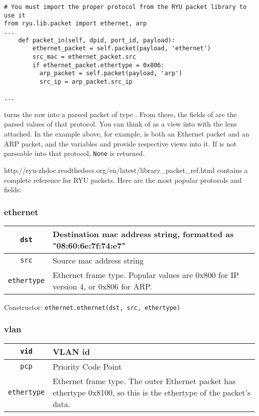 \begin{verbatim}
# You must import the proper protocol from the RYU packet library to use it
from ryu.lib.packet import ethernet, arp
...
    def packet_in(self, dpid, port_id, payload):
        ethernet_packet = self.packet(payload, 'ethernet')
        src_mac = ethernet_packet.src
        if ethernet_packet.ethertype = 0x806:
          arp_packet = self.packet(payload, 'arp')
          src_ip = arp_packet.src_ip

...
\end{verbatim}

 turns the raw 
 into a parsed packet of type .  
From there, the fields of  are the parsed values of that protocol.  
You can think of  as a view into  with the 
 lens attached.  
In the example above, for example,  is both an Ethernet packet and an ARP packet, and the 
variables  and  provide respective views into it.   
If  is not parseable into that protocol, \texttt{None} is returned.  

http://ryu-zhdoc.readthedocs.org/en/latest/library\_packet\_ref.html 
contains a complete reference for RYU packets. 
Here are the most popular protocols and fields:

\subsubsection{ethernet}

\bigskip
\begin{tabularx}{\linewidth}{|c|X|}
\hline\hline
\texttt{dst} & Destination mac address string, formatted as "08:60:6e:7f:74:e7" 
\\ \hline
\texttt{src} & Source mac address string 
\\ \hline
\texttt{ethertype} & Ethernet frame type.  
Popular values are 0x800 for IP version 4, or 0x806 for ARP.  
\\ \hline\hline
\end{tabularx}

\bigskip
Constructor: \texttt{ethernet.ethernet(dst, src, ethertype)}

\subsubsection{vlan}

\bigskip
\begin{tabularx}{\linewidth}{|c|X|}
\hline\hline
\texttt{vid} & VLAN id 
\\ \hline
\texttt{pcp} & Priority Code Point 
\\ \hline
\texttt{ethertype} & Ethernet frame type.  
The outer Ethernet packet has ethertype 0x8100, so this is the ethertype of the packet's data.
\\ \hline\hline
\end{tabularx}

